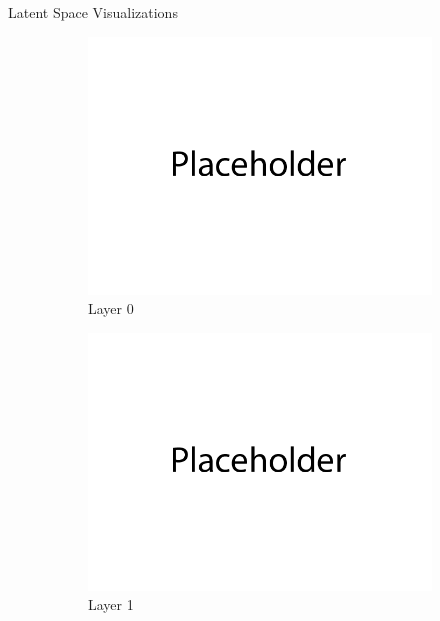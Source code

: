 \documentclass{article}
\begin{document}
Latent Space Visualizations
\begin{figure}[H]
    \centering
    \begin{subfigure}{0.32\textwidth}
        \centering
        \includegraphics[width=\textwidth]{figures/q1_latent_space_layer_0.png}
        \caption{Layer 0}
    \end{subfigure}
    \begin{subfigure}{0.32\textwidth}
        \centering
        \includegraphics[width=\textwidth]{figures/q1_latent_space_layer_1.png}
        \caption{Layer 1}
    \end{subfigure}
    \begin{subfigure}{0.32\textwidth}
        \centering

\end{subfigure}
\end{figure}
\end{document}
